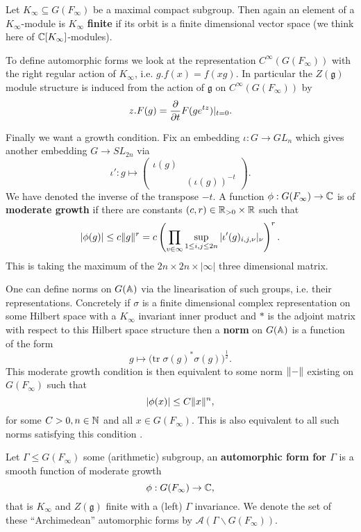 	Let \(K_\infty\subseteq  G(F_\infty)\) be a maximal compact subgroup. Then again an element of a \(K_\infty\)-module is \(K_\infty\) \textbf{finite} if its orbit is a finite dimensional vector space (we think here of \(\C[K_\infty]\)-modules).

	To define automorphic forms we look at the representation \(C^\infty(G(F_\infty))\) with the right regular action of \(K_\infty\), i.e. \(g.f(x) = f(xg)\).  In particular the \(Z(\mathfrak{g})\) module structure is induced from the action of \(\mathfrak{g}\) on \(C^\infty(G(F_\infty))\) by \label{lie_algebra_action}
	\[z.F(g) = \frac{\partial }{\partial t}F(ge^{tz})|_{t=0}.\] 
	
	Finally we want a growth condition. Fix an embedding \(\iota : G\to GL_n\) which gives another embedding \(G\to SL_{2n}\) via
	\[\iota': g\mapsto \begin{pmatrix}
		\iota (g) & \\
		& (\iota (g))^{-t}
	\end{pmatrix}.\]
	We have denoted the inverse of the transpose \(-t\). A function \(\phi : G(F_\infty) \to \C \) is of \textbf{moderate growth} if there are constants \((c,r)\in \R_{>0}\times \R\) such that 
	\[|\phi(g)| \leq c\norm{g}^r = c \left(\prod_{v\in\infty} \sup_{1\leq i, j\leq 2n} |\iota' (g)_{i,j, \nu}|_\nu\right)^r.\]
	This is taking the maximum of the \(2n\times 2n \times |\infty| \) three dimensional matrix. 

	\begin{remark}
		One can define norms on \(G(\A)\) via the linearisation of such groups, i.e. their representations. Concretely if \(\sigma\) is a finite dimensional complex representation on some Hilbert space with a \(K_\infty\) invariant inner product and \(\ast\) is the adjoint matrix with respect to this Hilbert space structure then a \textbf{norm} on \(G(\A)\) is a function of the form
		\[g\mapsto \big(\mathrm{tr }\; \sigma(g)^*\sigma(g)\big)^{\frac{1}{2}}.\]
		This moderate growth condition is then equivalent to some norm \(\lVert  -  \rVert\) existing on \(G(F_\infty)\) such that 
		\[|\phi(x)| \leq C\norm{x}^n,\]
		for some \(C>0, n\in \N\) and all \(x\in G(F_\infty)\). This is also equivalent to all such norms satisfying this condition \cite[1.2]{borelAutomorphicFormsRepresentations1979}.
	\end{remark}

	\begin{Definition}
		Let \(\Gamma\leq G(F_\infty)\) some (arithmetic) subgroup, an \textbf{automorphic form for \(\Gamma\)} is a smooth function of moderate growth 
		\[\phi: G(F_\infty) \to \C,\]
		that is \(K_\infty\) and \(Z(\mathfrak{g})\) finite with a (left) \(\Gamma\) invariance. We denote the set of these ``Archimedean'' automorphic forms by \(\mathcal{A}(\Gamma \backslash G(F_\infty))\).
	\end{Definition}



